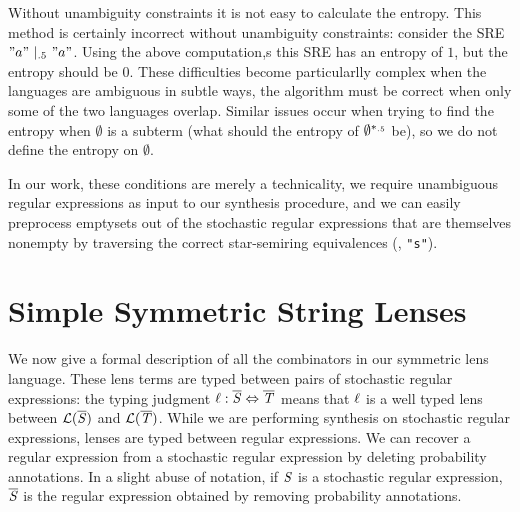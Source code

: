 \documentclass[acmsmall,screen,anonymous]{acmart}
\begin{document}
Without unambiguity constraints it is not easy to calculate the entropy. This
method is certainly incorrect without unambiguity constraints: consider the SRE
$\PRegexOr{\lstinline{"a"}}{\lstinline{"a"}}{.5}$. Using the above computation,s
this SRE has an entropy of $1$, but the entropy should be $0$. These
difficulties become particularlly complex when the languages are ambiguous in
subtle ways, the algorithm must be correct when only some of the two languages
overlap. Similar issues occur when trying to find the entropy when $\emptyset$
is a subterm (what should the entropy of $\emptyset^{*_{.5}}$ be), so we
do not define the entropy on $\emptyset$.

In our work, these conditions are merely a technicality, we require unambiguous
regular expressions as input to our synthesis procedure, and we can easily
preprocess emptysets out of the stochastic regular expressions that are
themselves nonempty by traversing the correct star-semiring equivalences (\EG,
 \SSREquiv \lstinline{"s"}).


\section{Simple Symmetric String Lenses}
\label{sec:ssl}
We now give a formal description of all the combinators in our symmetric lens
language. These lens terms are typed between pairs of stochastic regular
expressions: the typing judgment $\mathit{\ell} : \overline{\mathit{S}} \Leftrightarrow
\overline{\mathit{T}}$ means that $\mathit{\ell}$ is a well typed lens between
$\mathcal{L}(\overline{\mathit{S}})$ and $\mathcal{L}(\overline{\mathit{T}})$. While we are performing
synthesis on stochastic regular expressions, lenses are typed between regular
expressions.  We can recover a regular expression from a stochastic regular
expression by deleting probability annotations.  In a slight abuse of notation,
if $\mathit{S}$ is a stochastic regular expression, $\overline{\mathit{S}}$ is the regular
expression obtained by removing probability annotations.
\end{document}
